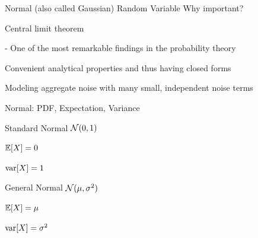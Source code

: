 \begin{frame}{Normal (also called Gaussian) Random Variable}
{\large Why important?}

\plitemsep 0.4in
\bci
\item Central limit theorem

- One of the most remarkable findings in the probability theory

\item Convenient analytical properties and thus having closed forms

\item Modeling aggregate noise with many small, independent noise terms

\eci
\end{frame}

\begin{frame}{Normal: PDF, Expectation, Variance}

{
\plitemsep 0.1in
\bci
\item<1-> Standard Normal $\mathcal N(0,1)$
\item<1-> $\mathbb{E}[ X ] = 0$

\item<1-> $\text{var}[ X ] = 1$
\eci
}
{
\plitemsep 0.1in
\bci
\item<2-> General Normal $\mathcal N(\mu, \sigma^2)$

\item<2-> $\mathbb{E}[ X ] = \mu$

\item<2-> $\text{var}[ X ] = \sigma^2$

\eci
}

\medskip

\end{frame}

